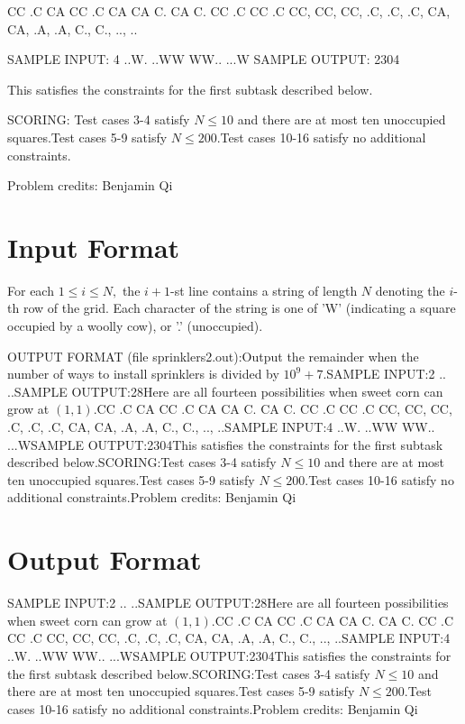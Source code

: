 \documentclass[12pt]{article}
\begin{document}
CC  .C  CA  CC  .C  CA  CA  C.  CA  C.  CC  .C  CC  .C  
CC, CC, CC, .C, .C, .C, CA, CA, .A, .A, C., C., .., ..

SAMPLE INPUT:
4
..W.
..WW
WW..
...W
SAMPLE OUTPUT: 
2304

This satisfies the constraints for the first subtask described below.

SCORING:
Test cases 3-4 satisfy $N\le 10$ and there are at most ten unoccupied
squares.Test cases 5-9 satisfy $N\le 200$.Test cases 10-16 satisfy no additional constraints.


Problem credits: Benjamin Qi



\section*{Input Format}
For each $1\le i\le N,$ the $i+1$-st line contains a string of length $N$
denoting the $i$-th row of the grid. Each character of the string is one of 'W'
(indicating a square occupied by a woolly cow), or '.' (unoccupied).

OUTPUT FORMAT (file sprinklers2.out):Output the remainder when the number of ways to install sprinklers is divided by
$10^9+7.$SAMPLE INPUT:2
..
..SAMPLE OUTPUT:28Here are all fourteen possibilities when sweet corn can grow at $(1,1)$.CC  .C  CA  CC  .C  CA  CA  C.  CA  C.  CC  .C  CC  .C  
CC, CC, CC, .C, .C, .C, CA, CA, .A, .A, C., C., .., ..SAMPLE INPUT:4
..W.
..WW
WW..
...WSAMPLE OUTPUT:2304This satisfies the constraints for the first subtask described below.SCORING:Test cases 3-4 satisfy $N\le 10$ and there are at most ten unoccupied
squares.Test cases 5-9 satisfy $N\le 200$.Test cases 10-16 satisfy no additional constraints.Problem credits: Benjamin Qi

\section*{Output Format}
SAMPLE INPUT:2
..
..SAMPLE OUTPUT:28Here are all fourteen possibilities when sweet corn can grow at $(1,1)$.CC  .C  CA  CC  .C  CA  CA  C.  CA  C.  CC  .C  CC  .C  
CC, CC, CC, .C, .C, .C, CA, CA, .A, .A, C., C., .., ..SAMPLE INPUT:4
..W.
..WW
WW..
...WSAMPLE OUTPUT:2304This satisfies the constraints for the first subtask described below.SCORING:Test cases 3-4 satisfy $N\le 10$ and there are at most ten unoccupied
squares.Test cases 5-9 satisfy $N\le 200$.Test cases 10-16 satisfy no additional constraints.Problem credits: Benjamin Qi
\end{document}
